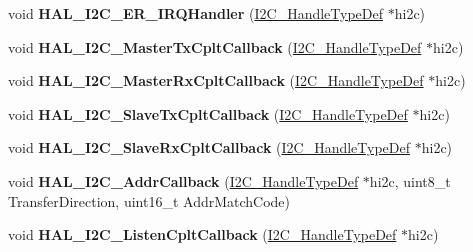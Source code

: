 \begin{DoxyCompactItemize}
void {\bfseries H\+A\+L\+\_\+\+I2\+C\+\_\+\+E\+R\+\_\+\+I\+R\+Q\+Handler} (\hyperlink{struct_i2_c___handle_type_def}{I2\+C\+\_\+\+Handle\+Type\+Def} $\ast$hi2c)
\item 
\mbox{\label{group___i2_c___exported___functions___group2_gaa258e0eb52bbc34002a46dc2db89a84b}} 
void {\bfseries H\+A\+L\+\_\+\+I2\+C\+\_\+\+Master\+Tx\+Cplt\+Callback} (\hyperlink{struct_i2_c___handle_type_def}{I2\+C\+\_\+\+Handle\+Type\+Def} $\ast$hi2c)
\item 
\mbox{\label{group___i2_c___exported___functions___group2_ga5782358f977ddf450b203fc075833a1d}} 
void {\bfseries H\+A\+L\+\_\+\+I2\+C\+\_\+\+Master\+Rx\+Cplt\+Callback} (\hyperlink{struct_i2_c___handle_type_def}{I2\+C\+\_\+\+Handle\+Type\+Def} $\ast$hi2c)
\item 
\mbox{\label{group___i2_c___exported___functions___group2_ga7e086b3ee67187ea072aec6fb4d52aad}} 
void {\bfseries H\+A\+L\+\_\+\+I2\+C\+\_\+\+Slave\+Tx\+Cplt\+Callback} (\hyperlink{struct_i2_c___handle_type_def}{I2\+C\+\_\+\+Handle\+Type\+Def} $\ast$hi2c)
\item 
\mbox{\label{group___i2_c___exported___functions___group2_gae23a5b1ce68867c35093ff2b5931e9a0}} 
void {\bfseries H\+A\+L\+\_\+\+I2\+C\+\_\+\+Slave\+Rx\+Cplt\+Callback} (\hyperlink{struct_i2_c___handle_type_def}{I2\+C\+\_\+\+Handle\+Type\+Def} $\ast$hi2c)
\item 
\mbox{\label{group___i2_c___exported___functions___group2_ga3b2a6a0ff585d8e529a73ba7d291c92d}} 
void {\bfseries H\+A\+L\+\_\+\+I2\+C\+\_\+\+Addr\+Callback} (\hyperlink{struct_i2_c___handle_type_def}{I2\+C\+\_\+\+Handle\+Type\+Def} $\ast$hi2c, uint8\+\_\+t Transfer\+Direction, uint16\+\_\+t Addr\+Match\+Code)
\item 
\mbox{\label{group___i2_c___exported___functions___group2_ga22544d1e6a14392cd5fe41e4e4f4cc96}} 
void {\bfseries H\+A\+L\+\_\+\+I2\+C\+\_\+\+Listen\+Cplt\+Callback} (\hyperlink{struct_i2_c___handle_type_def}{I2\+C\+\_\+\+Handle\+Type\+Def} $\ast$hi2c)
\item 

\end{DoxyCompactItemize}
